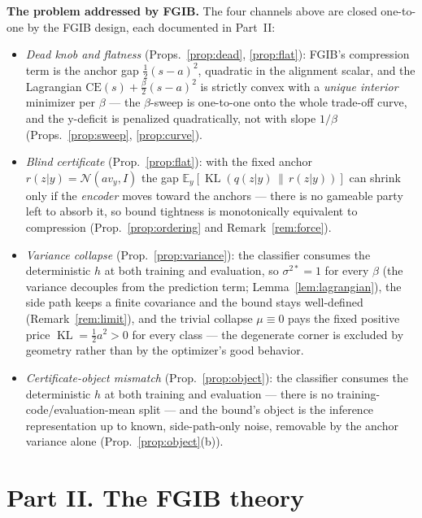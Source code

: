 \textbf{The problem addressed by FGIB.}
The four channels above are closed one-to-one by the FGIB design, each documented in
Part~II:
\begin{itemize}
\item \emph{Dead knob and flatness} (Props.~\ref{prop:dead}, \ref{prop:flat}): FGIB's
compression term is the anchor gap $\tfrac12(s-a)^2$, quadratic in the alignment scalar,
and the Lagrangian $\mathrm{CE}(s) + \tfrac{\beta}{2}(s-a)^2$ is strictly convex with a
\emph{unique interior} minimizer per $\beta$ --- the $\beta$-sweep is one-to-one onto the
whole trade-off curve, and the y-deficit is penalized quadratically, not with slope
$1/\beta$ (Props.~\ref{prop:sweep}, \ref{prop:curve}).
\item \emph{Blind certificate} (Prop.~\ref{prop:flat}): with the fixed anchor
$r(z|y) = \mathcal{N}(a v_y, I)$ the gap
$\mathbb{E}_y[\operatorname{KL}(q(z|y)\,\|\,r(z|y))]$ can shrink only if the
\emph{encoder} moves toward the anchors --- there is no gameable party left to absorb it,
so bound tightness is monotonically equivalent to compression
(Prop.~\ref{prop:ordering} and Remark~\ref{rem:force}).
\item \emph{Variance collapse} (Prop.~\ref{prop:variance}): the classifier consumes the
deterministic $h$ at both training and evaluation, so $\sigma^{2*} = 1$ for every $\beta$
(the variance decouples from the prediction term; Lemma~\ref{lem:lagrangian}), the
side path keeps a finite covariance and the bound stays well-defined
(Remark~\ref{rem:limit}), and the trivial collapse $\mu \equiv 0$ pays
the fixed positive price $\operatorname{KL} = \tfrac12 a^2 > 0$ for every class --- the
degenerate corner is excluded by geometry rather than by the optimizer's good behavior.
\item \emph{Certificate-object mismatch} (Prop.~\ref{prop:object}): the classifier
consumes the deterministic $h$ at both training and evaluation --- there is no
training-code/evaluation-mean split --- and the bound's object is the inference
representation up to known, side-path-only noise, removable by the anchor variance alone
(Prop.~\ref{prop:object}(b)).
\end{itemize}

\section*{Part II. The FGIB theory}


